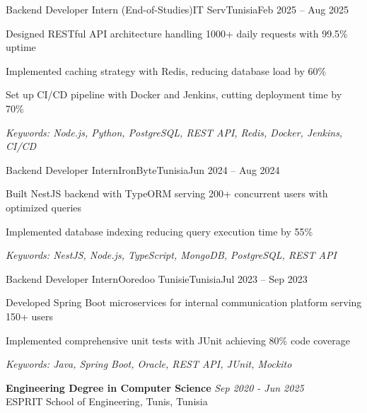 \documentclass[11pt,a4paper]{article}
\begin{document}
\makecvheader
\makecontactinfo


\begin{internship}{Backend Developer Intern (End-of-Studies)}{IT Serv}{Tunisia}{Feb 2025 -- Aug 2025}{}
  \item Designed RESTful API architecture handling 1000+ daily requests with 99.5\% uptime
  \item Implemented caching strategy with Redis, reducing database load by 60\%
  \item Set up CI/CD pipeline with Docker and Jenkins, cutting deployment time by 70\%
  \item[] \textit{\footnotesize Keywords: Node.js, Python, PostgreSQL, REST API, Redis, Docker, Jenkins, CI/CD}
\end{internship}

\begin{internship}{Backend Developer Intern}{IronByte}{Tunisia}{Jun 2024 -- Aug 2024}{}
  \item Built NestJS backend with TypeORM serving 200+ concurrent users with optimized queries
  \item Implemented database indexing reducing query execution time by 55\%
  \item[] \textit{\footnotesize Keywords: NestJS, Node.js, TypeScript, MongoDB, PostgreSQL, REST API}
\end{internship}

\begin{internship}{Backend Developer Intern}{Ooredoo Tunisie}{Tunisia}{Jul 2023 -- Sep 2023}{}
  \item Developed Spring Boot microservices for internal communication platform serving 150+ users
  \item Implemented comprehensive unit tests with JUnit achieving 80\% code coverage
  \item[] \textit{\footnotesize Keywords: Java, Spring Boot, Oracle, REST API, JUnit, Mockito}
\end{internship}

\textbf{Engineering Degree in Computer Science} \hfill \textit{Sep 2020 - Jun 2025}\\[-2pt]
ESPRIT School of Engineering, Tunis, Tunisia

\end{document}
